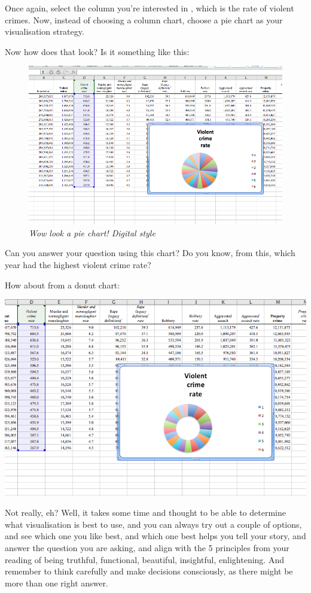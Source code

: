 \documentclass[
]{book}
\begin{document}
Once again, select the column you're interested in , which is the rate of violent crimes. Now, instead of choosing a column chart, choose a pie chart as your visualisation strategy.

Now how does that look? Is it something like this:

\begin{figure}
\centering
\includegraphics{imgs/desc_viz_pie.png}
\caption{\emph{Wow look a pie chart! Digital style}}
\end{figure}

Can you answer your question using this chart? Do you know, from this, which year had the highest violent crime rate?

How about from a donut chart:

\includegraphics{imgs/desc_viz_donut.png}

Not really, eh? Well, it takes some time and thought to be able to determine what visualisation is best to use, and you can always try out a couple of options, and see which one you like best, and which one best helps you tell your story, and answer the question you are asking, and align with the 5 principles from your reading of being truthful, functional, beautiful, insightful, enlightening. And remember to think carefully and make decisions consciously, as there might be more than one right answer.
\end{document}
